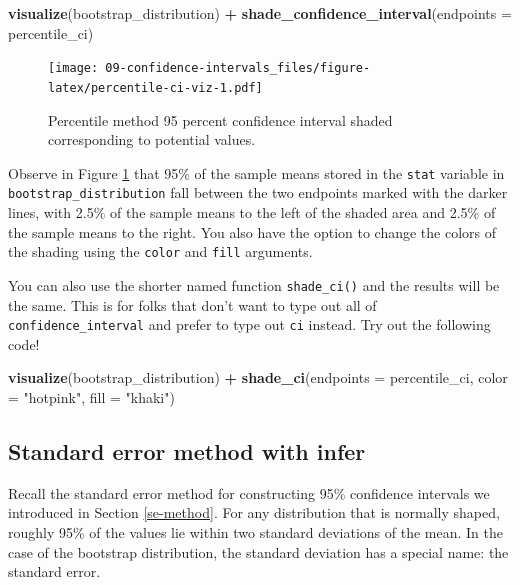 \documentclass[
]{book}
\newenvironment{Shaded}{\begin{snugshade}}{\end{snugshade}}
\newcommand{\DataTypeTok}[1]{\textcolor[rgb]{0.13,0.29,0.53}{#1}}
\newcommand{\KeywordTok}[1]{\textcolor[rgb]{0.13,0.29,0.53}{\textbf{#1}}}
\newcommand{\NormalTok}[1]{#1}
\newcommand{\OperatorTok}[1]{\textcolor[rgb]{0.81,0.36,0.00}{\textbf{#1}}}
\newcommand{\StringTok}[1]{\textcolor[rgb]{0.31,0.60,0.02}{#1}}
\begin{document}
\begin{Shaded}
\begin{Highlighting}[]
\KeywordTok{visualize}\NormalTok{(bootstrap_distribution) }\OperatorTok{+}\StringTok{ }
\StringTok{  }\KeywordTok{shade_confidence_interval}\NormalTok{(}\DataTypeTok{endpoints =}\NormalTok{ percentile_ci)}
\end{Highlighting}
\end{Shaded}

\begin{figure}
\centering
\texttt{[image: 09-confidence-intervals\_files/figure-latex/percentile-ci-viz-1.pdf]}
\caption{\label{fig:percentile-ci-viz}Percentile method 95 percent confidence interval shaded corresponding to potential values.}
\end{figure}

Observe in Figure \ref{fig:percentile-ci-viz} that 95\% of the sample means stored in the \texttt{stat} variable in \texttt{bootstrap\_distribution} fall between the two endpoints marked with the darker lines, with 2.5\% of the sample means to the left of the shaded area and 2.5\% of the sample means to the right. You also have the option to change the colors of the shading using the \texttt{color} and \texttt{fill} arguments.

You can also use the shorter named function \texttt{shade\_ci()} and the results will be the same. This is for folks that don't want to type out all of \texttt{confidence\_interval} and prefer to type out \texttt{ci} instead. Try out the following code!

\begin{Shaded}
\begin{Highlighting}[]
\KeywordTok{visualize}\NormalTok{(bootstrap_distribution) }\OperatorTok{+}\StringTok{ }
\StringTok{  }\KeywordTok{shade_ci}\NormalTok{(}\DataTypeTok{endpoints =}\NormalTok{ percentile_ci, }\DataTypeTok{color =} \StringTok{"hotpink"}\NormalTok{, }\DataTypeTok{fill =} \StringTok{"khaki"}\NormalTok{)}
\end{Highlighting}
\end{Shaded}

\hypertarget{infer-se}{%
\subsection{Standard error method with infer}\label{infer-se}}

Recall the standard error method for constructing 95\% confidence intervals we introduced in Section \ref{se-method}. For any distribution that is normally shaped, roughly 95\% of the values lie within two standard deviations of the mean. In the case of the bootstrap distribution, the standard deviation has a special name: the standard error.
\end{document}
